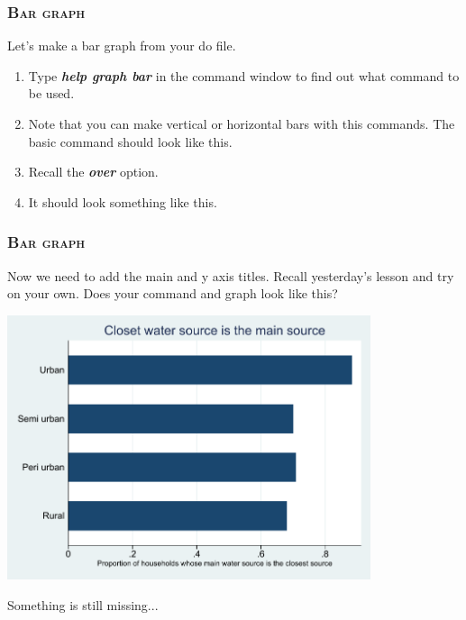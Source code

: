 \documentclass[10pt]{beamer}
\begin{document}
	\begin{frame}
	\frametitle{\textsc{Bar graph}}	
		 Let's make a bar graph from your do file.
		\begin{enumerate}
			 \item Type \textbf{\textit{help graph bar}} in the command window 
				   to find out what command to be used.
			 \onslide<2-> \item Note that you can make vertical or horizontal 
								bars with this commands. The basic command should
								look like this.
		
\begin{stlog}\end{stlog}
			\vspace{1mm}
			 \item Recall the \textbf{\textit{over}} option.
			\vspace{1mm}
			\onslide<4-> \item It should look something like this.
		
\begin{stlog}\end{stlog}
		\end{enumerate}
	\end{frame}
	
	\begin{frame}
	\frametitle{\textsc{Bar graph}}	
		 Now we need to add the main and y axis titles.
					 Recall yesterday's lesson and try on your own. \vspace{1mm}
		\onslide<2-> Does your command and graph look like this?
		
\begin{center}
    \includegraphics[width=0.8\textwidth]{bar_2.pdf}
\end{center}
			\vspace{1mm}
		 Something is still missing...
	\end{frame}
\end{document}
